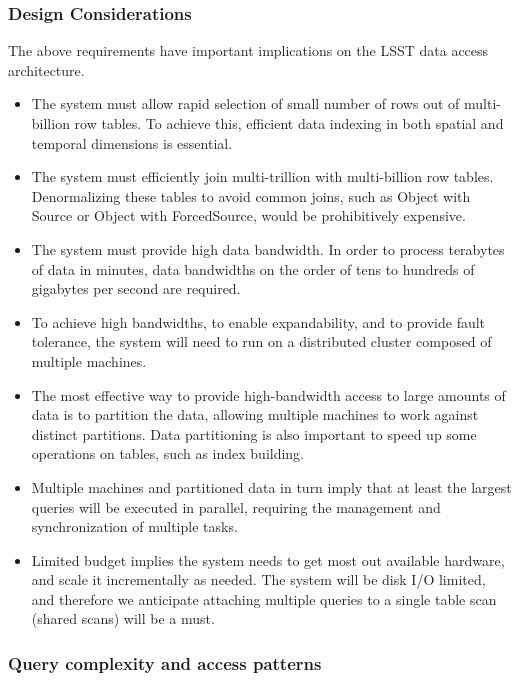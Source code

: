 \documentclass[DM,toc]{lsstdoc}
\begin{document}
\subsubsection{Design Considerations}\label{design-consideration}

The above requirements have important implications on the LSST data
access architecture.

\begin{itemize}
\item
  The system must allow rapid selection of small number of rows out of
  multi-billion row tables. To achieve this, efficient data indexing in
  both spatial and temporal dimensions is essential.
\item
  The system must efficiently join multi-trillion with multi-billion row
  tables. Denormalizing these tables to avoid common joins, such as
  Object with Source or Object with ForcedSource, would be prohibitively
  expensive.
\item
  The system must provide high data bandwidth. In order to process
  terabytes of data in minutes, data bandwidths on the order of tens to
  hundreds of gigabytes per second are required.
\item
  To achieve high bandwidths, to enable expandability, and to provide
  fault tolerance, the system will need to run on a distributed cluster
  composed of multiple machines.
\item
  The most effective way to provide high-bandwidth access to large
  amounts of data is to partition the data, allowing multiple machines
  to work against distinct partitions. Data partitioning is also
  important to speed up some operations on tables, such as index
  building.
\item
  Multiple machines and partitioned data in turn imply that at least the
  largest queries will be executed in parallel, requiring the management
  and synchronization of multiple tasks.
\item
  Limited budget implies the system needs to get most out available
  hardware, and scale it incrementally as needed. The system will be
  disk I/O limited, and therefore we anticipate attaching multiple
  queries to a single table scan (shared scans) will be a must.
\end{itemize}

\subsubsection{Query complexity and access
patterns}\label{query-complexity-and-access-patterns}
\end{document}
